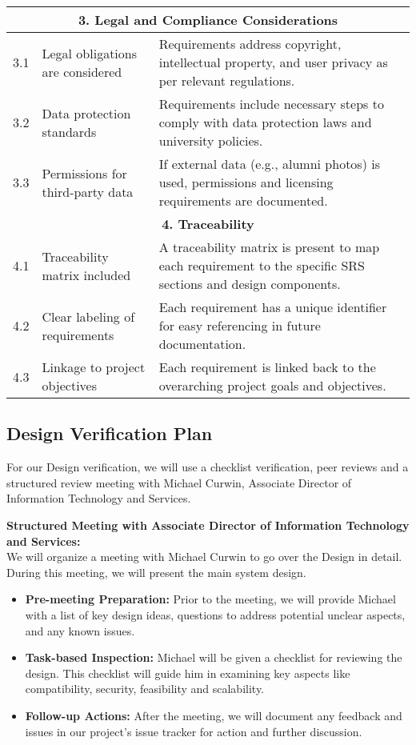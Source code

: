 \documentclass[12pt, titlepage]{article}
\begin{document}
\begin{longtable}{|p{1cm}|p{5.5cm}|p{8.5cm}|}
\multicolumn{3}{|c|}{\textbf{3. Legal and Compliance Considerations}} \\
\hline
3.1 & Legal obligations are considered & Requirements address copyright, intellectual property, and user privacy as per relevant regulations. \\
\hline
3.2 & Data protection standards & Requirements include necessary steps to comply with data protection laws and university policies. \\
\hline
3.3 & Permissions for third-party data & If external data (e.g., alumni photos) is used, permissions and licensing requirements are documented. \\
\hline

\multicolumn{3}{|c|}{\textbf{4. Traceability}} \\
\hline
4.1 & Traceability matrix included & A traceability matrix is present to map each requirement to the specific SRS sections and design components. \\
\hline
4.2 & Clear labeling of requirements & Each requirement has a unique identifier for easy referencing in future documentation. \\
\hline
4.3 & Linkage to project objectives & Each requirement is linked back to the overarching project goals and objectives. \\
\hline

\end{longtable}


\subsection{Design Verification Plan}

For our Design verification, we will use a checklist verification, peer reviews and a structured review meeting with Michael Curwin, Associate Director of Information Technology and Services.

\textbf{Structured Meeting with Associate Director of Information Technology and Services:} \\
We will organize a meeting with Michael Curwin to go over the Design in detail. During this meeting, we will present the main system design.

\begin{itemize}
  \item \textbf{Pre-meeting Preparation:} Prior to the meeting, we will provide Michael with a list of key design ideas, questions to address potential unclear aspects, and any known issues.
  \item \textbf{Task-based Inspection:} Michael will be given a checklist for reviewing the design. This checklist will guide him in examining key aspects like compatibility, security, feasibility and scalability.
  \item \textbf{Follow-up Actions:} After the meeting, we will document any feedback and issues in our project’s issue tracker for action and further discussion.
\end{itemize}
\end{document}
